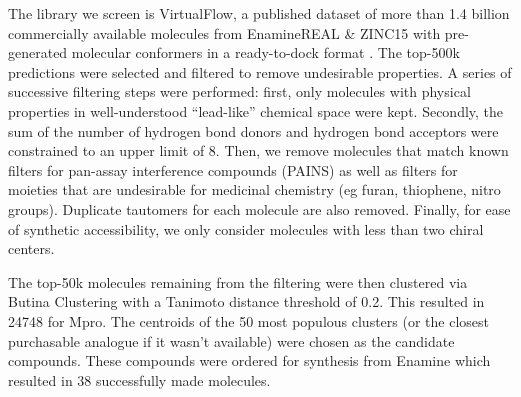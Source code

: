 The library we screen is VirtualFlow, a published dataset of more than 1.4 billion commercially available molecules from EnamineREAL \& ZINC15 with pre-generated molecular conformers in a ready-to-dock format \cite{Gorgulla2020VirtualFlow}. The top-500k predictions were selected and filtered to remove undesirable properties. A series of successive filtering steps were performed: first, only molecules with physical properties in well-understood ``lead-like'' chemical space \cite{ChemSpace} were kept. Secondly, the sum of the number of hydrogen bond donors and hydrogen bond acceptors were constrained to an upper limit of 8. Then, we remove molecules that match known filters for pan-assay interference compounds (PAINS) \cite{Baell2010Pains} as well as filters for moieties that are undesirable for medicinal chemistry (eg furan, thiophene, nitro groups). Duplicate tautomers for each molecule are also removed. Finally, for ease of synthetic accessibility, we only consider molecules with less than two chiral centers.

The top-50k molecules remaining from the filtering were then clustered via Butina Clustering \cite{Butina1999Clustering} with a Tanimoto distance threshold of 0.2. This resulted in 24748 for Mpro. The centroids of the 50 most populous clusters (or the closest purchasable analogue if it wasn't available) were chosen as the candidate compounds. These compounds were ordered for synthesis from Enamine which resulted in 38 successfully made molecules.


